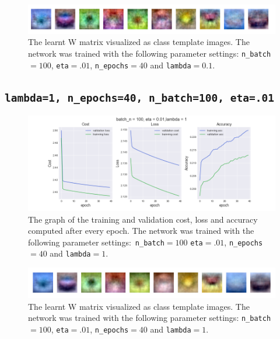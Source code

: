 \documentclass[11pt]{article}
\begin{document}
\begin{figure}[H]
	\centerline{\includegraphics[width=200mm,scale=0.5]{lamda_01_eta_001_ct.png}}
	\caption{The learnt W matrix visualized as class template images. The network was
		trained with the following parameter settings: \texttt{n\_batch}$=100$, \texttt{eta}$=.01$, \texttt{n\_epochs}$=40$
		and \texttt{lambda}$=0.1$.}
	\label{fig:3.1}
\end{figure}

\subsection{\texttt{lambda=1, n\_epochs=40, n\_batch=100, eta=.01}}\label{1.4}

\begin{figure}[H]
	\centerline{\includegraphics[width=195mm,scale=0.7]{lamda_1_eta_001.png}}
	\caption{The graph of the training and validation cost, loss and accuracy computed after every epoch. The network was trained with the following parameter settings$:$ \texttt{n\_batch}$=100$ \texttt{eta}$=.01$, \texttt{n\_epochs}$=40$ and  \texttt{lambda}$=1$.}
	\label{fig:4}
\end{figure}

\begin{figure}[H]
	\centerline{\includegraphics[width=195mm,scale=0.5]{lamda_1_eta_001_ct.png}}
	\caption{The learnt W matrix visualized as class template images. The network was
	trained with the following parameter settings: \texttt{n\_batch}$=100$, \texttt{eta}$=.01$, \texttt{n\_epochs}$=40$
	and \texttt{lambda}$=1$.}
	\label{fig:4.1}
\end{figure}
\end{document}
